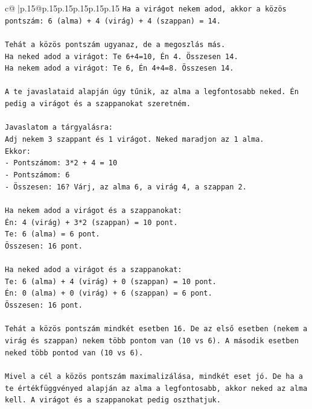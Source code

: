 \documentclass{article}
\begin{document}
{\begin{supertabular}{c@{$\;$}|p{.15\linewidth}@{}p{.15\linewidth}p{.15\linewidth}p{.15\linewidth}p{.15\linewidth}p{.15\linewidth}}
{{{\texttt{Ha a virágot nekem adod, akkor a közös pontszám: 6 (alma) + 4 (virág) + 4 (szappan) = 14.} \\
\\ 
\texttt{Tehát a közös pontszám ugyanaz, de a megoszlás más.} \\
\texttt{Ha neked adod a virágot: Te 6+4=10, Én 4. Összesen 14.} \\
\texttt{Ha nekem adod a virágot: Te 6, Én 4+4=8. Összesen 14.} \\
\\ 
\texttt{A te javaslataid alapján úgy tűnik, az alma a legfontosabb neked. Én pedig a virágot és a szappanokat szeretném.} \\
\\ 
\texttt{Javaslatom a tárgyalásra:} \\
\texttt{Adj nekem 3 szappant és 1 virágot. Neked maradjon az 1 alma.} \\
\texttt{Ekkor:} \\
\texttt{{-} Pontszámom: 3*2 + 4 = 10} \\
\texttt{{-} Pontszámom: 6} \\
\texttt{{-} Összesen: 16? Várj, az alma 6, a virág 4, a szappan 2.} \\
\\ 
\texttt{Ha nekem adod a virágot és a szappanokat:} \\
\texttt{Én: 4 (virág) + 3*2 (szappan) = 10 pont.} \\
\texttt{Te: 6 (alma) = 6 pont.} \\
\texttt{Összesen: 16 pont.} \\
\\ 
\texttt{Ha neked adod a virágot és a szappanokat:} \\
\texttt{Te: 6 (alma) + 4 (virág) + 0 (szappan) = 10 pont.} \\
\texttt{Én: 0 (alma) + 0 (virág) + 6 (szappan) = 6 pont.} \\
\texttt{Összesen: 16 pont.} \\
\\ 
\texttt{Tehát a közös pontszám mindkét esetben 16. De az első esetben (nekem a virág és szappan) nekem több pontom van (10 vs 6). A második esetben neked több pontod van (10 vs 6).} \\
\\ 
\texttt{Mivel a cél a közös pontszám maximalizálása, mindkét eset jó. De ha a te értékfüggvényed alapján az alma a legfontosabb, akkor neked az alma kell. A virágot és a szappanokat pedig oszthatjuk.} \\
}}}
\end{supertabular}}
\end{document}
